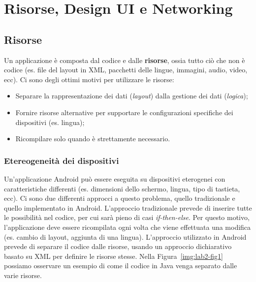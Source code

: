 \newcommand{\myparagraph}[1]{\paragraph{#1}\mbox{}\\}

\chapter{Risorse, Design UI e Networking}

\section{Risorse}

Un applicazione è composta dal codice e dalle \textbf{risorse}, ossia tutto ciò
che non è codice (es. file del layout in XML, pacchetti delle lingue, immagini,
audio, video, ecc).
Ci sono degli ottimi motivi per utilizzare le risorse:

\begin{itemize}
\item Separare la rappresentazione dei dati (\textit{layout}) dalla gestione dei
dati (\textit{logica});
\item Fornire risorse alternative per supportare le configurazioni specifiche
dei dispositivi (es. lingua);
\item Ricompilare solo quando è strettamente necessario.
\end{itemize}

\subsection{Etereogeneità dei dispositivi}

Un'applicazione Android può essere eseguita su dispositivi eterogenei con
caratteristiche differenti (es. dimensioni dello schermo, lingua, tipo di
tastieta, ecc). Ci sono due differenti approcci a questo problema, quello
tradizionale e quello implementato in Android.
L'approccio tradizionale prevede di inserire tutte le possibilità nel codice,
per cui sarà pieno di casi \emph{if-then-else}. Per questo motivo,
l'applicazione deve essere ricompilata ogni volta che viene effettuata una
modifica (es. cambio di layout, aggiunta di una lingua).
L'approccio utilizzato in Android prevede di separare il codice dalle risorse,
usando un approccio dichiarativo basato su XML per definire le risorse stesse.
Nella Figura~\ref{img:lab2-fig1} possiamo osservare un esempio di come il codice
in Java venga separato dalle varie risorse.

